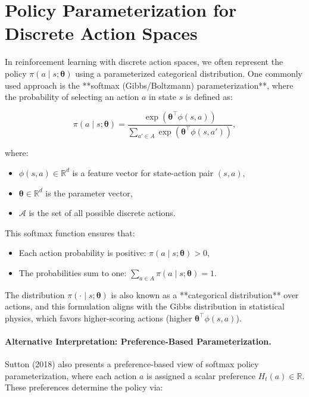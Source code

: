 \section{Policy Parameterization for Discrete Action Spaces}

In reinforcement learning with discrete action spaces, we often represent the policy \( \pi(a \mid s; \boldsymbol{\theta}) \) using a parameterized categorical distribution. One commonly used approach is the **softmax (Gibbs/Boltzmann) parameterization**, where the probability of selecting an action \( a \) in state \( s \) is defined as:

\[
\pi(a \mid s; \boldsymbol{\theta}) = \frac{\exp(\boldsymbol{\theta}^\top \phi(s, a))}{\sum_{a' \in A} \exp(\boldsymbol{\theta}^\top \phi(s, a'))},
\]

where:
\begin{itemize}
    \item \( \phi(s, a) \in \mathbb{R}^d \) is a feature vector for state-action pair \( (s, a) \),
    \item \( \boldsymbol{\theta} \in \mathbb{R}^d \) is the parameter vector,
    \item \( \mathcal{A} \) is the set of all possible discrete actions.
\end{itemize}

This softmax function ensures that:
\begin{itemize}
    \item Each action probability is positive: \( \pi(a \mid s; \boldsymbol{\theta}) > 0 \),
    \item The probabilities sum to one: \( \sum_{a \in A} \pi(a \mid s; \boldsymbol{\theta}) = 1 \).
\end{itemize}

The distribution \( \pi(\cdot \mid s; \boldsymbol{\theta}) \) is also known as a **categorical distribution** over actions, and this formulation aligns with the Gibbs distribution in statistical physics, which favors higher-scoring actions (higher \( \boldsymbol{\theta}^\top \phi(s, a) \)).

\paragraph{Alternative Interpretation: Preference-Based Parameterization.}
Sutton (2018) also presents a preference-based view of softmax policy parameterization, where each action \( a \) is assigned a scalar preference \( H_t(a) \in \mathbb{R} \). These preferences determine the policy via:

